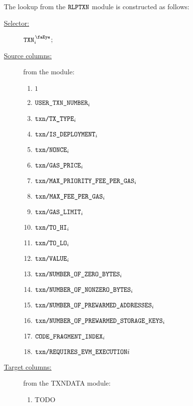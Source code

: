 The lookup from the $\texttt{RLPTXN}$ module is constructed as follows:
\begin{description}
	\item[\underline{Selector:}] $\isTxn_{i}$;
	\item[\underline{Source columns:}] from the \rlpTxnMod{} module:
	\begin{multicols}{3}
	\begin{enumerate}
		\item $1$
		\item $\texttt{USER}\texttt{\_}\texttt{TXN\_NUMBER}_{i}$
		\item $\texttt{txn}\texttt{/}\texttt{{TX\_TYPE}}{}_{i}$
		\item $\texttt{txn}\texttt{/}\texttt{{IS\_DEPLOYMENT}}{}_{i}$
		\item $\texttt{txn}\texttt{/}\texttt{{\texttt{NONCE}}}{}_{i}$
		\item $\texttt{txn}\texttt{/}\texttt{{GAS\_PRICE}}{}_{i}$
		\item $\texttt{txn}\texttt{/}\texttt{{MAX\_PRIORITY\_FEE\_PER\_GAS}}{}_{i}$
		\item $\texttt{txn}\texttt{/}\texttt{{MAX\_FEE\_PER\_GAS}}{}_{i}$
		\item $\texttt{txn}\texttt{/}\texttt{{GAS\_LIMIT}}{}_{i}$
		\item $\texttt{txn}\texttt{/}\texttt{{TO\_HI}}{}_{i}$
		\item $\texttt{txn}\texttt{/}\texttt{{TO\_LO}}{}_{i}$
		\item $\texttt{txn}\texttt{/}\texttt{{VALUE}}{}_{i}$
		\item $\texttt{txn}\texttt{/}\texttt{{NUMBER\_OF\_ZERO\_BYTES}}{}_{i}$
		\item $\texttt{txn}\texttt{/}\texttt{{NUMBER\_OF\_NONZERO\_BYTES}}{}_{i}$
		\item $\texttt{txn}\texttt{/}\texttt{{NUMBER\_OF\_PREWARMED\_ADDRESSES}}{}_{i}$
		\item $\texttt{txn}\texttt{/}\texttt{{NUMBER\_OF\_PREWARMED\_STORAGE\_KEYS}}{}_{i}$
		\item $\texttt{CODE\_FRAGMENT\_INDEX}{}_{i}$
		\item $\texttt{txn}\texttt{/}\texttt{{REQUIRES\_EVM\_EXECUTION}}{}{i}$
	\end{enumerate}
	\end{multicols}
\item[\underline{Target columns:}] from the TXNDATA module: 
	\begin{multicols}{3}
	\begin{enumerate}
		\item TODO
	\end{enumerate} 
	\end{multicols}
\end{description}
